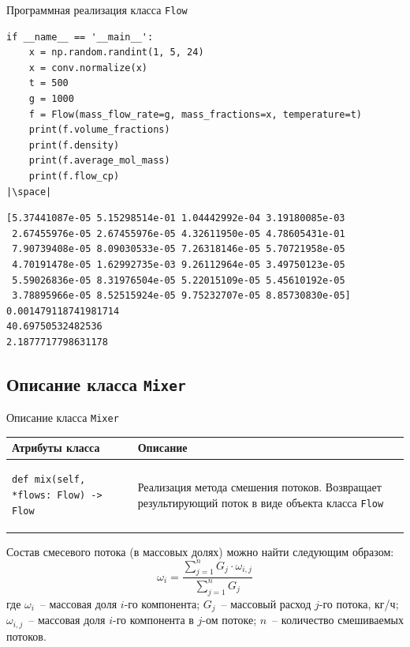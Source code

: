 \documentclass[aspectratio=169, mathserif]{beamer}	%
\begin{document}
\begin{frame}[fragile]{Программная реализация класса \texttt{Flow}}
\scriptsize
\begin{verbatim}
if __name__ == '__main__':
    x = np.random.randint(1, 5, 24)
    x = conv.normalize(x)
    t = 500
    g = 1000
    f = Flow(mass_flow_rate=g, mass_fractions=x, temperature=t)
    print(f.volume_fractions)
    print(f.density)
    print(f.average_mol_mass)
    print(f.flow_cp)
|\space|
\end{verbatim}
\begin{verbatim}
[5.37441087e-05 5.15298514e-01 1.04442992e-04 3.19180085e-03
 2.67455976e-05 2.67455976e-05 4.32611950e-05 4.78605431e-01
 7.90739408e-05 8.09030533e-05 7.26318146e-05 5.70721958e-05
 4.70191478e-05 1.62992735e-03 9.26112964e-05 3.49750123e-05
 5.59026836e-05 8.31976504e-05 5.22015109e-05 5.45610192e-05
 3.78895966e-05 8.52515924e-05 9.75232707e-05 8.85730830e-05]
0.001479118741981714
40.69750532482536
2.1877717798631178
    \end{verbatim}
\vfill
\end{frame}

\subsection{Описание класса \texttt{Mixer}}
\begin{frame}[fragile]{Описание класса \texttt{Mixer}}
\scriptsize
\begin{table}[h!]
	\centering
	\renewcommand{\arraystretch}{1.2}
	\begin{tabular}{|p{.49\linewidth}|p{.49\linewidth}|}
		\hline
		\textbf{Атрибуты класса} & \textbf{Описание}  \\
		\hline
\begin{minipage}{\linewidth}
\vfill
\begin{verbatim}
def mix(self, *flows: Flow) -> Flow
\end{verbatim}
\vfill
\end{minipage}
		& Реализация метода смешения потоков. Возвращает результирующий поток в виде объекта класса \texttt{Flow}\\
		\hline
	\end{tabular}
\end{table}
\vfill
Состав смесевого потока (в массовых долях) можно найти следующим образом:
\vfill
$$
	\omega _i = \dfrac{\sum \limits_ {j=1} ^{n} G_j \cdot \omega _{i,j}}{\sum \limits_ {j=1} ^{n} G_j}
$$
\vfill
где $\omega _i$~-- массовая доля $i$-го компонента; $G_j$~-- массовый расход $j$-го потока, кг/ч; $\omega _{i,j}$~-- массовая доля $i$-го компонента в $j$-ом потоке; $n$~-- количество смешиваемых потоков.
\vfill
\vfill
\end{frame}
\end{document}
